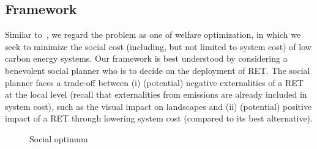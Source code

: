 \documentclass[review, 3p, times]{elsarticle} %
\begin{document}

    \subsection{Framework} \label{subsec:framework}
    Similar to~\cite{Drechsler2011}, we regard the problem as one of welfare optimization, in which we seek to minimize
    the social cost (including, but not limited to system cost) of low carbon energy systems.
    Our framework is best understood by considering a benevolent social planner who is to decide on the deployment of
    RET\@.
    The social planner faces a trade-off between
    (i) (potential) negative externalities of a RET at the local level (recall that externalities from emissions are
    already included in system cost), such as the visual impact on landscapes and
    (ii) (potential) positive impact of a RET through lowering system cost (compared to its best alternative).

    \begin{figure}[H]
        \centering
        \caption{Social optimum}
        \label{figure:social-optimum}
    \end{figure}
\end{document}
